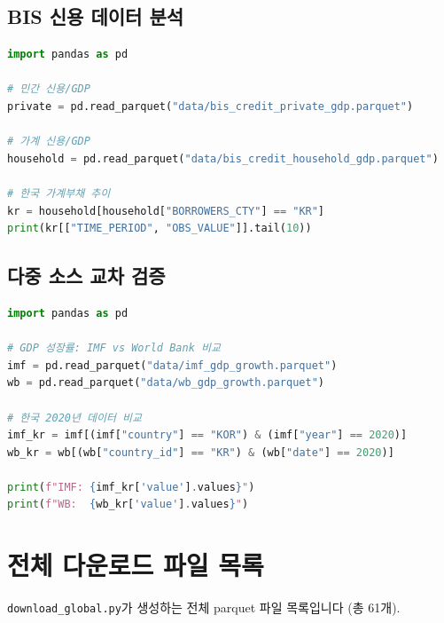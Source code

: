 \documentclass[11pt,a4paper]{article}
\newcommand{\code}[1]{\texttt{#1}}
\begin{document}
\subsection{BIS 신용 데이터 분석}

\begin{lstlisting}[language=Python]
import pandas as pd

# 민간 신용/GDP
private = pd.read_parquet("data/bis_credit_private_gdp.parquet")

# 가계 신용/GDP
household = pd.read_parquet("data/bis_credit_household_gdp.parquet")

# 한국 가계부채 추이
kr = household[household["BORROWERS_CTY"] == "KR"]
print(kr[["TIME_PERIOD", "OBS_VALUE"]].tail(10))
\end{lstlisting}

\subsection{다중 소스 교차 검증}

\begin{lstlisting}[language=Python]
import pandas as pd

# GDP 성장률: IMF vs World Bank 비교
imf = pd.read_parquet("data/imf_gdp_growth.parquet")
wb = pd.read_parquet("data/wb_gdp_growth.parquet")

# 한국 2020년 데이터 비교
imf_kr = imf[(imf["country"] == "KOR") & (imf["year"] == 2020)]
wb_kr = wb[(wb["country_id"] == "KR") & (wb["date"] == 2020)]

print(f"IMF: {imf_kr['value'].values}")
print(f"WB:  {wb_kr['value'].values}")
\end{lstlisting}


\section{전체 다운로드 파일 목록}

\code{download\_global.py}가 생성하는 전체 parquet 파일 목록입니다 (총 61개).
\end{document}
